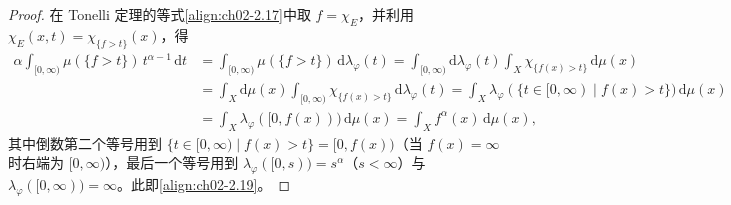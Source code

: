 \documentclass[../../main.tex]{subfiles}%
\begin{document}
\begin{proof}
在 Tonelli 定理的等式\eqref{align:ch02-2.17}中取 $f=\chi_E$，并利用 $\chi_E(x,t)=\chi_{\{f>t\}}(x)$，得
\begin{align*}
\alpha\int_{[0,\infty)}\mu(\{f>t\})\,t^{\alpha-1}\,\mathrm{d}t
&=\int_{[0,\infty)}\mu(\{f>t\})\,\mathrm{d}\lambda_\varphi(t)
=\int_{[0,\infty)}\mathrm{d}\lambda_\varphi(t)\int_X\chi_{\{f(x)>t\}}\,\mathrm{d}\mu(x)\\
&=\int_X\mathrm{d}\mu(x)\int_{[0,\infty)}\chi_{\{f(x)>t\}}\,\mathrm{d}\lambda_\varphi(t)
=\int_X\lambda_\varphi(\{t\in[0,\infty)\mid f(x)>t\})\,\mathrm{d}\mu(x)\\
&=\int_X\lambda_\varphi([0,f(x)))\,\mathrm{d}\mu(x)
=\int_Xf^\alpha(x)\,\mathrm{d}\mu(x),
\end{align*}
其中倒数第二个等号用到 $\{t\in[0,\infty)\mid f(x)>t\}=[0,f(x))$（当 $f(x)=\infty$ 时右端为 $[0,\infty)$），最后一个等号用到 $\lambda_\varphi([0,s))=s^\alpha$（$s<\infty$）与 $\lambda_\varphi([0,\infty))=\infty$。此即\eqref{align:ch02-2.19}。
\end{proof}
\end{document}
